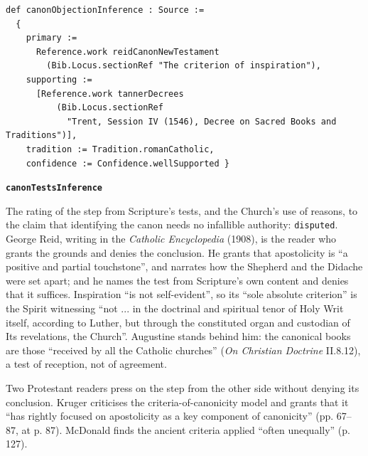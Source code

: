 \documentclass[11pt]{article}
\begin{document}
{\small\begin{verbatim}
def canonObjectionInference : Source :=
  {
    primary :=
      Reference.work reidCanonNewTestament
        (Bib.Locus.sectionRef "The criterion of inspiration"),
    supporting :=
      [Reference.work tannerDecrees
          (Bib.Locus.sectionRef
            "Trent, Session IV (1546), Decree on Sacred Books and Traditions")],
    tradition := Tradition.romanCatholic,
    confidence := Confidence.wellSupported }
\end{verbatim}}
\par\medskip\noindent\textbf{\texttt{canon\allowbreak{}Tests\allowbreak{}Inference}}\par\nobreak\noindent
The rating of the step from Scripture’s tests, and the Church’s use of reasons, to the claim that identifying the canon needs no infallible authority: \texttt{disputed}. George Reid, writing in the \emph{Catholic Encyclopedia} (1908), is the reader who grants the grounds and denies the conclusion. He grants that apostolicity is “a positive and partial touchstone”, and narrates how the Shepherd and the Didache were set apart; and he names the test from Scripture’s own content and denies that it suffices. Inspiration “is not self-evident”, so its “sole absolute criterion” is the Spirit witnessing “not ... in the doctrinal and spiritual tenor of Holy Writ itself, according to Luther, but through the constituted organ and custodian of Its revelations, the Church”. Augustine stands behind him: the canonical books are those “received by all the Catholic churches” (\emph{On Christian Doctrine} II.8.12), a test of reception, not of agreement.

Two Protestant readers press on the step from the other side without denying its conclusion. Kruger criticises the criteria-of-canonicity model and grants that it “has rightly focused on apostolicity as a key component of canonicity” (pp. 67–87, at p. 87). McDonald finds the ancient criteria applied “often unequally” (p. 127).
\end{document}
